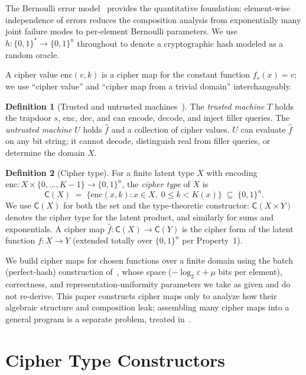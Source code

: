 \documentclass[11pt]{article}
\theoremstyle{definition}
\newtheorem{definition}{Definition}[section]
\theoremstyle{plain}
\theoremstyle{remark}
\newcommand{\enc}{\mathrm{enc}}
\newcommand{\dec}{\mathrm{dec}}
\newcommand{\fhat}{\hat{f}}
\newcommand{\cipher}[1]{\mathsf{C}(#1)}
\newcommand{\B}{\{0,1\}}
\begin{document}
The Bernoulli error model~\cite{towell2026bernoulli} provides the
quantitative foundation: element-wise independence of errors reduces the
composition analysis from exponentially many joint failure modes to
per-element Bernoulli parameters.
We use $h : \B^* \to \B^n$ throughout to denote a cryptographic hash
modeled as a random oracle.

A cipher value $\enc(v, k)$ is a cipher map for the constant function
$f_v(x) = v$; we use ``cipher value'' and ``cipher map from a trivial
domain'' interchangeably.

\begin{definition}[Trusted and untrusted machines~{\cite[Sec.~5]{towell2026cipher}}]
\label{def:machines}
The \emph{trusted machine} $T$ holds the trapdoor $s$, $\enc$, $\dec$, and
can encode, decode, and inject filler queries.
The \emph{untrusted machine} $U$ holds $\fhat$ and a collection of cipher
values.
$U$ can evaluate $\fhat$ on any bit string; it cannot decode, distinguish
real from filler queries, or determine the domain $X$.
\end{definition}

\begin{definition}[Cipher type]
\label{def:cipher-type}
For a finite latent type $X$ with encoding $\enc : X \times
\{0, \ldots, K{-}1\} \to \B^n$, the \emph{cipher type} of $X$ is
\[
\cipher{X} \;=\; \{\enc(x, k) : x \in X,\; 0 \leq k < K(x)\} \;\subseteq\; \B^n.
\]
We use $\cipher{X}$ for both the set and the type-theoretic constructor:
$\cipher{X \times Y}$ denotes the cipher type for the latent product, and
similarly for sums and exponentials.
A cipher map $\fhat : \cipher{X} \to \cipher{Y}$ is the cipher form of
the latent function $f : X \to Y$ (extended totally over $\B^n$ per
Property~1).
\end{definition}

We build cipher maps for chosen functions over a finite domain using the
batch (perfect-hash) construction of~\cite[Sec.~6]{towell2026cipher},
whose space ($-\log_2\varepsilon + \mu$ bits per element), correctness,
and representation-uniformity parameters we take as given and do not
re-derive.
This paper constructs cipher maps only to analyze how their algebraic
structure and composition leak; assembling many cipher maps into a
general program is a separate problem, treated
in~\cite{towell2026cipherprog}.


\section{Cipher Type Constructors}
\label{sec:types}
\end{document}
